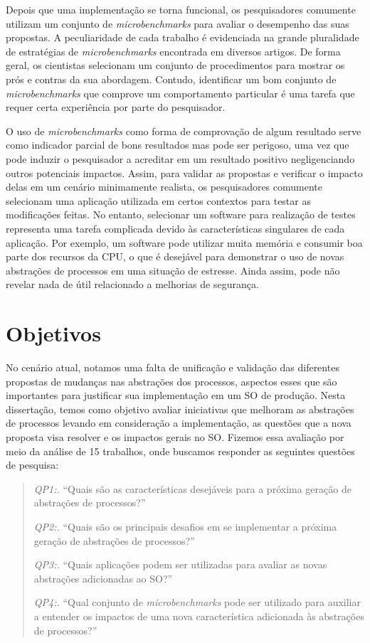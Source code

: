 Depois que uma implementação se torna funcional, os pesquisadores comumente
utilizam um conjunto de \emph{microbenchmarks} para avaliar o desempenho das
suas propostas. A peculiaridade de cada trabalho é evidenciada na grande
pluralidade de estratégias de \emph{microbenchmarks} encontrada em diversos
artigos.  De forma geral, os cientistas selecionam um conjunto de procedimentos
para mostrar os prós e contras da sua abordagem. Contudo, identificar um bom
conjunto de \emph{microbenchmarks} que comprove um comportamento particular é
uma tarefa que requer certa experiência por parte do pesquisador.

O uso de \textit{microbenchmarks} como forma de comprovação de algum resultado
serve como indicador parcial de bons resultados mas pode ser perigoso, uma vez
que pode induzir o pesquisador a acreditar em um resultado positivo
negligenciando outros potenciais impactos. Assim, para validar as propostas e
verificar o impacto delas em um cenário minimamente realista, os pesquisadores
comumente selecionam uma aplicação utilizada em certos contextos para testar as
modificações feitas. No entanto, selecionar um software para realização de
testes representa uma tarefa complicada devido às características singulares de
cada aplicação. Por exemplo, um software pode utilizar muita memória e consumir
boa parte dos recursos da CPU, o que é desejável para demonstrar o uso de novas
abstrações de processos em uma situação de estresse. Ainda assim, pode não
revelar nada de útil relacionado a melhorias de segurança.

\section{Objetivos}

No cenário atual, notamos uma falta de unificação e validação das diferentes
propostas de mudanças nas abstrações dos processos, aspectos esses que são
importantes para justificar sua implementação em um SO de produção. Nesta
dissertação, temos como objetivo avaliar iniciativas que melhoram as abstrações de
processos levando em consideração a implementação, as questões que a nova
proposta visa resolver e os impactos gerais no SO. Fizemos essa avaliação por
meio da análise de 15 trabalhos, onde buscamos responder as seguintes
questões de pesquisa:

\begin{quote}
 \item \textit{QP1:.} ``Quais são as características desejáveis para a próxima geração de abstrações de processos?''
 \item \textit{QP2:.} ``Quais são os principais desafios em se implementar a próxima geração de abstrações de processos?''
 \item \textit{QP3:.} ``Quais aplicações podem ser utilizadas para avaliar as novas abstrações adicionadas ao SO?''
 \item \textit{QP4:.} ``Qual conjunto de \emph{microbenchmarks} pode ser utilizado para auxiliar a entender os impactos de uma nova característica adicionada às abstrações de processos?''
\end{quote}


